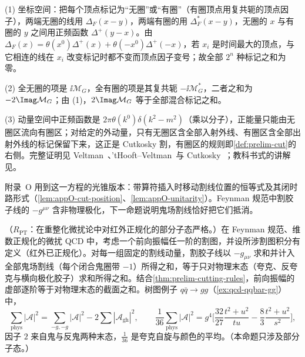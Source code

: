 \begin{proofsketch}
(1) 坐标空间：把每个顶点标记为“无圈”或“有圈”（有圈顶点用复共轭的顶点因子），两端无圈的线用 $\Delta_F(x-y)$，两端有圈的用 $\Delta_F^*(x-y)$，无圈的 $x$ 与有圈的 $y$ 之间用正频函数 $\Delta^+(y-x)$。由 $\Delta_F(x)=\theta(x^0)\Delta^+(x)+\theta(-x^0)\Delta^+(-x)$，若 $x_i$ 是时间最大的顶点，与它相连的线在 $x_i$ 改变标记时都不变而顶点因子变号；故全部 $2^n$ 种标记之和为零。

(2) 全无圈的项是 $\ii\mathcal M_G$，全有圈的项是其复共轭 $-\ii\mathcal M_G^*$，二者之和为 $-2\Imag\mathcal M_G$；由 (1)，$2\Imag\mathcal M_G$ 等于全部混合标记之和。

(3) 动量空间中正频函数是 $2\pi\theta(k^0)\delta(k^2-m^2)$（乘以分子），正能量只能由无圈区流向有圈区；对给定的外动量，只有无圈区含全部入射外线、有圈区含全部出射外线的标记保留下来，这正是 Cutkosky 割，有圈区的规则即\cref{def:prelim-cut}的右侧。完整证明见 Veltman~\cite{Veltman1963}、'tHooft--Veltman~\cite{tHooftVeltman1974}与 Cutkosky~\cite{Cutkosky1960}；教科书式的讲解见\cite[第~7.3~节]{PeskinSchroeder1995}。
\end{proofsketch}

附录~O 用到这一方程的光锥版本：带算符插入时移动割线位置的恒等式及其闭时路形式（\cref{lem:appO-cut-position}、\cref{lem:appO-unitarity}）。Feynman 规范中割胶子线的 $-g^{\mu\nu}$ 含非物理极化，下一命题说明鬼场割线恰好把它们抵消。

\begin{proposition}\label{prop:prelim-unitarity}
（$R_{\mathrm{PT}}$：在重整化微扰论中对红外正规化的部分子态严格。）在 Feynman 规范、维数正规化的微扰 QCD 中，考虑一个前向振幅任一阶的割图，并设所涉割图积分有定义（红外已正规化）。对每一组固定的割线动量，割胶子线以 $-g_{\mu\nu}$ 求和并计入全部鬼场割线（每个闭合鬼圈带 $-1$）所得之和，等于只对物理末态（夸克、反夸克与横向极化胶子）求和所得之和。结合\cref{thm:prelim-cutting-rules}，前向振幅的虚部逐阶等于对物理末态的截面之和。树图例子 $q\bar q\to gg$（\cref{ex:qcd-qqbar-gg}）中，%
\begin{equation}\label{eq:prelim-qqgg}
\sum_{\mathrm{phys}}|\mathcal A|^2=\sum_{-g,-g}|\mathcal A|^2-2\sum|\mathcal A_{\mathrm{gh}}|^2,\qquad
\frac1{36}\sum_{\mathrm{phys}}|\mathcal A|^2=g^4\Big[\frac{32}{27}\frac{t^2+u^2}{tu}-\frac83\frac{t^2+u^2}{s^2}\Big],
\end{equation}
因子 $2$ 来自鬼与反鬼两种末态，$\frac1{36}$ 是夸克自旋与颜色的平均。（本命题只涉及部分子态。）
\end{proposition}

